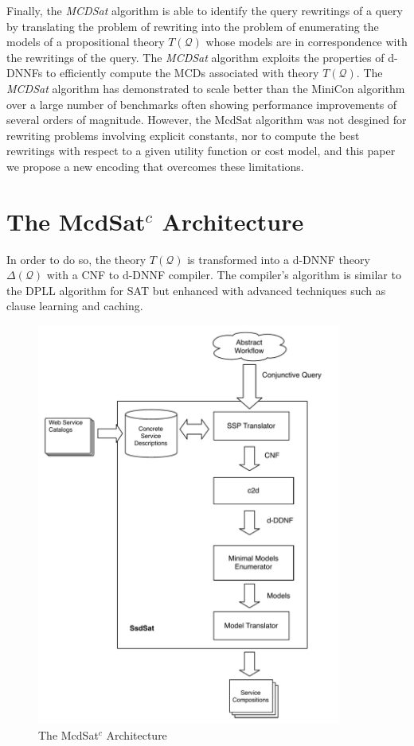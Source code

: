 \documentclass{llncs}
\newcommand{\Q}{\mathcal{Q}}
\newcommand{\Theory}[1]{T(#1)}
\begin{document}
\begin{description}
Finally,  the
{\it MCDSat} algorithm is able to identify the query rewritings of a query by translating the problem of rewriting
into the problem of enumerating the models of a propositional
theory  $\Theory{\Q}$ whose models are in correspondence
with the rewritings of the query. 
The {\it MCDSat} algorithm exploits the properties of d-DNNFs to efficiently 
compute the MCDs associated with theory $\Theory{\Q}$.
The  {\it MCDSat} algorithm has demonstrated to scale better than the MiniCon
algorithm over a large number of benchmarks often showing performance
improvements of several orders of magnitude. However, the McdSat algorithm was not desgined for rewriting problems involving explicit constants,
nor to compute the best rewritings with respect to a given utility function or cost model, and this paper we propose a new encoding  that overcomes these limitations.


\end{description}

\section{The McdSat$^c$ Architecture}

In order to do so, the theory $\Theory{\Q}$ is transformed into a d-DNNF
theory $\Delta(\Q)$ with a CNF to d-DNNF compiler.
The compiler's algorithm is similar to the DPLL algorithm
for SAT but enhanced with advanced techniques such as clause
learning and caching.
\begin{figure}
\centering
\includegraphics[width=10cm]{mdcsatC.pdf}
\caption{The McdSat$^c$ Architecture}
\label{fig:dnnf}
\end{figure}
\end{document}
